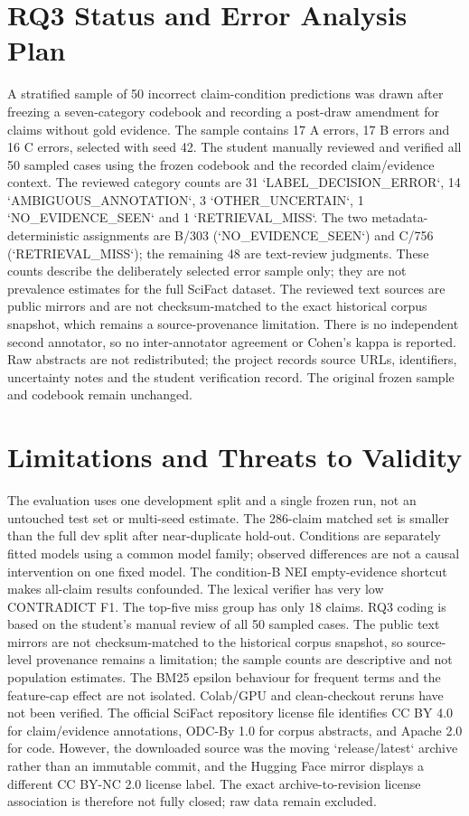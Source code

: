 \documentclass[10pt]{article}
\begin{document}
\section{RQ3 Status and Error Analysis Plan}
A stratified sample of 50 incorrect claim-condition predictions was drawn after freezing a seven-category codebook and recording a post-draw amendment for claims without gold evidence. The sample contains 17 A errors, 17 B errors and 16 C errors, selected with seed 42. The student manually reviewed and verified all 50 sampled cases using the frozen codebook and the recorded claim/evidence context. The reviewed category counts are 31 `LABEL_DECISION_ERROR`, 14 `AMBIGUOUS_ANNOTATION`, 3 `OTHER_UNCERTAIN`, 1 `NO_EVIDENCE_SEEN` and 1 `RETRIEVAL_MISS`. The two metadata-deterministic assignments are B/303 (`NO_EVIDENCE_SEEN`) and C/756 (`RETRIEVAL_MISS`); the remaining 48 are text-review judgments. These counts describe the deliberately selected error sample only; they are not prevalence estimates for the full SciFact dataset. The reviewed text sources are public mirrors and are not checksum-matched to the exact historical corpus snapshot, which remains a source-provenance limitation. There is no independent second annotator, so no inter-annotator agreement or Cohen's kappa is reported. Raw abstracts are not redistributed; the project records source URLs, identifiers, uncertainty notes and the student verification record. The original frozen sample and codebook remain unchanged.

\section{Limitations and Threats to Validity}
The evaluation uses one development split and a single frozen run, not an untouched test set or multi-seed estimate. The 286-claim matched set is smaller than the full dev split after near-duplicate hold-out. Conditions are separately fitted models using a common model family; observed differences are not a causal intervention on one fixed model. The condition-B NEI empty-evidence shortcut makes all-claim results confounded. The lexical verifier has very low CONTRADICT F1. The top-five miss group has only 18 claims. RQ3 coding is based on the student's manual review of all 50 sampled cases. The public text mirrors are not checksum-matched to the historical corpus snapshot, so source-level provenance remains a limitation; the sample counts are descriptive and not population estimates. The BM25 epsilon behaviour for frequent terms and the feature-cap effect are not isolated. Colab/GPU and clean-checkout reruns have not been verified. The official SciFact repository license file identifies CC BY 4.0 for claim/evidence annotations, ODC-By 1.0 for corpus abstracts, and Apache 2.0 for code. However, the downloaded source was the moving `release/latest` archive rather than an immutable commit, and the Hugging Face mirror displays a different CC BY-NC 2.0 license label. The exact archive-to-revision license association is therefore not fully closed; raw data remain excluded.
\end{document}
